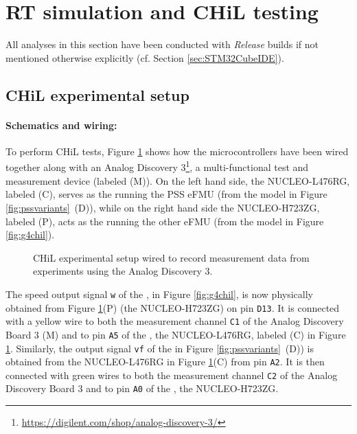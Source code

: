 \section{RT simulation and CHiL testing}\label{sec:rtchil}

All analyses in this section have been conducted with \textit{Release} builds if not mentioned otherwise explicitly (cf. Section \ref{sec:STM32CubeIDE}).

\subsection{CHiL experimental setup}

\paragraph{Schematics and wiring:} To perform CHiL tests, Figure \ref{fig:wiring-diagram} shows how the microcontrollers have been wired together along with an Analog Discovery 3\footnote{\tiny{\url{https://digilent.com/shop/analog-discovery-3/}}}, a multi-functional test and measurement device (labeled (M)). On the left hand side, the NUCLEO-L476RG, labeled (C), serves as the \controller{} running the PSS eFMU (from the model in Figure \ref{fig:pssvariants}~(D)), while on the right hand side the NUCLEO-H723ZG, labeled (P), acts as the \plant{} running the other eFMU (from the model in Figure \ref{fig:g4chil}).

\begin{figure}[h]
    \centerline{}
    \vspace{-2ex}
    \caption{CHiL experimental setup wired to record measurement data from experiments using the Analog Discovery 3.}
    \label{fig:wiring-diagram}
    \vspace{-1ex}
\end{figure}

The speed output signal \texttt{w} of the \plant{}, in Figure \ref{fig:g4chil}, is now physically obtained from Figure \ref{fig:wiring-diagram}(P) (the NUCLEO-H723ZG) on pin \texttt{D13}. It is connected with a yellow wire to both the measurement channel \texttt{C1} of the Analog Discovery Board 3 (M) and to pin \texttt{A5} of the \controller{}, the NUCLEO-L476RG, labeled (C) in Figure \ref{fig:wiring-diagram}. Similarly, the output signal \texttt{vf} of the \controller{} in Figure \ref{fig:pssvariants}~(D)) is obtained from the NUCLEO-L476RG in Figure \ref{fig:wiring-diagram}(C) from pin \texttt{A2}. It is then connected with green wires to both the measurement channel \texttt{C2} of the Analog Discovery Board 3 and to pin \texttt{A0} of the \plant{}, the NUCLEO-H723ZG.


